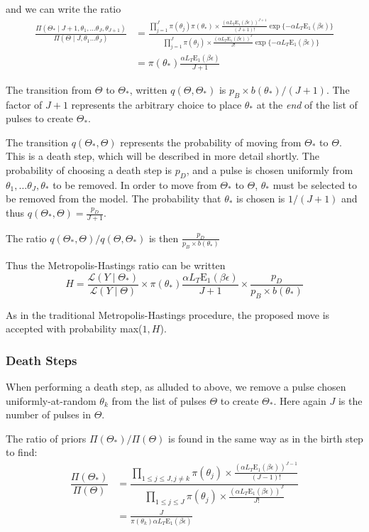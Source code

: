 \documentclass[iop,onecolumn]{emulateapj}
\newcommand{\Eone}{{\ensuremath{\mathrm{E}_1}}}
\begin{document}
    and we can write the ratio 
\begin{align}
  \frac{ \Pi ( \Theta_* \mid J+1, \theta_1, \dots \theta_J, \theta_{J+1} )}{ \Pi(\Theta \mid J, \theta_1 \dots \theta_J)} & = \frac{\displaystyle\prod_{j = 1}^J \pi(\theta_j) \pi(\theta_*) \times \frac{(\alpha L_T  \Eone(\beta \epsilon) )^{J+1}}{(J+1)!} \exp\{-\alpha L_T  \Eone(\beta \epsilon)\} }{ \displaystyle\prod_{j = 1}^J \pi(\theta_j) \times \frac{(\alpha L_T  \Eone(\beta \epsilon) )^J}{J!} \exp\{-\alpha L_T  \Eone(\beta \epsilon)\}} \\
 & = \pi(\theta_*) \frac{\alpha L_T  \Eone(\beta \epsilon)}{J+1}
\end{align}

The transition from $\Theta$ to $\Theta_*$, written $q(\Theta, \Theta_*)$ is $p_B \times b(\theta_*)/ (J+1)$. The factor of $J+1$ represents the arbitrary choice to place $\theta_*$ at the \emph{end} of the list of pulses to create $\Theta_*$.

The transition $q(\Theta_*, \Theta)$ represents the probability of moving from $\Theta_*$ to $\Theta$. This is a death step, which will be described in more detail shortly. The probability of choosing a death step is $p_D$, and a pulse is chosen uniformly from $\theta_1, \dots \theta_J, \theta_*$ to be removed. In order to move from $\Theta_*$ to $\Theta$, $\theta_*$ must be selected to be removed from the model.  The probability that $\theta_*$ is chosen is $1/(J+1)$ and thus $q(\Theta_*, \Theta) = \frac{p_D}{J+1}$.

The ratio $q(\Theta_*, \Theta)/q(\Theta, \Theta_*)$ is then $\frac{p_D}{p_B \times b(\theta_*) }$

Thus the Metropolis-Hastings ratio can be written
\[ H =  \frac{\mathcal{L}(Y \mid \Theta_* )}{\mathcal{L}(Y \mid \Theta )} \times{\pi(\theta_*) \frac{\alpha L_T  \Eone(\beta \epsilon)}{J+1}}  \times \frac{p_D}{p_B \times b(\theta_*)} \]

As in the traditional Metropolis-Hastings procedure, the proposed move is accepted with probability max($1,H$).
\subsubsection{Death Steps}
When performing a death step, as alluded to above, we remove a pulse chosen uniformly-at-random $\theta_k$ from the list of pulses $\Theta$ to create $\Theta_*$. Here again $J$ is the number of pulses in $\Theta$.

The ratio of priors $\Pi(\Theta_*)/\Pi(\Theta)$ is found in the same way as in the birth step to find:
\begin{align}
\dfrac{ \Pi(\Theta_*)} {\Pi(\Theta)} & = 
\dfrac{ \displaystyle\prod_{1 \leq j \leq J, j \neq k} \pi(\theta_j) \times \frac{(\alpha L_T  \Eone(\beta \epsilon) )^{J-1}}{(J-1)!} }
{\displaystyle\prod_{1 \leq j \leq J} \pi(\theta_j) \times \frac{(\alpha L_T  \Eone(\beta \epsilon) )^{J}}{J!} } \\
& =  \frac{J}{\pi(\theta_k) \alpha L_T  \Eone(\beta \epsilon)}
\end{align}
\end{document}
